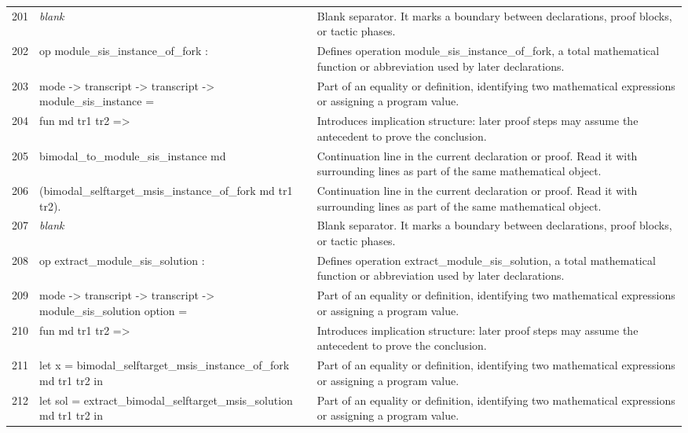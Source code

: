 \documentclass[10pt]{article}
\begin{document}
\begin{longtable}{r L{0.53\textwidth} L{0.37\textwidth}}
201 & {\ttfamily\scriptsize \emph{blank}} & Blank separator.  It marks a boundary between declarations, proof blocks, or tactic phases. \\
202 & {\ttfamily\scriptsize op module\_sis\_instance\_of\_fork :} & Defines operation module\_sis\_instance\_of\_fork, a total mathematical function or abbreviation used by later declarations. \\
203 & {\ttfamily\scriptsize   mode -> transcript -> transcript -> module\_sis\_instance =} & Part of an equality or definition, identifying two mathematical expressions or assigning a program value. \\
204 & {\ttfamily\scriptsize   fun md tr1 tr2 =>} & Introduces implication structure: later proof steps may assume the antecedent to prove the conclusion. \\
205 & {\ttfamily\scriptsize     bimodal\_to\_module\_sis\_instance md} & Continuation line in the current declaration or proof.  Read it with surrounding lines as part of the same mathematical object. \\
206 & {\ttfamily\scriptsize       (bimodal\_selftarget\_msis\_instance\_of\_fork md tr1 tr2).} & Continuation line in the current declaration or proof.  Read it with surrounding lines as part of the same mathematical object. \\
207 & {\ttfamily\scriptsize \emph{blank}} & Blank separator.  It marks a boundary between declarations, proof blocks, or tactic phases. \\
208 & {\ttfamily\scriptsize op extract\_module\_sis\_solution :} & Defines operation extract\_module\_sis\_solution, a total mathematical function or abbreviation used by later declarations. \\
209 & {\ttfamily\scriptsize   mode -> transcript -> transcript -> module\_sis\_solution option =} & Part of an equality or definition, identifying two mathematical expressions or assigning a program value. \\
210 & {\ttfamily\scriptsize   fun md tr1 tr2 =>} & Introduces implication structure: later proof steps may assume the antecedent to prove the conclusion. \\
211 & {\ttfamily\scriptsize     let x = bimodal\_selftarget\_msis\_instance\_of\_fork md tr1 tr2 in} & Part of an equality or definition, identifying two mathematical expressions or assigning a program value. \\
212 & {\ttfamily\scriptsize     let sol = extract\_bimodal\_selftarget\_msis\_solution md tr1 tr2 in} & Part of an equality or definition, identifying two mathematical expressions or assigning a program value. \\

\end{longtable}
\end{document}
